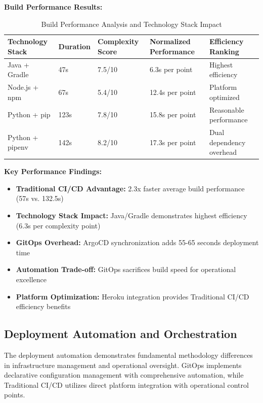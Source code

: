 \textbf{Build Performance Results:}

\begin{table}[H]
\centering
\caption{Build Performance Analysis and Technology Stack Impact}
\label{tab:build-performance-analysis}
\begin{tabular}{|p{3cm}|p{2cm}|p{2.5cm}|p{2.5cm}|p{3cm}|}
\hline
\textbf{Technology Stack} & \textbf{Duration} & \textbf{Complexity Score} & \textbf{Normalized Performance} & \textbf{Efficiency Ranking} \\
\hline
Java + Gradle & 47s & 7.5/10 & 6.3s per point & Highest efficiency \\
\hline
Node.js + npm & 67s & 5.4/10 & 12.4s per point & Platform optimized \\
\hline
Python + pip & 123s & 7.8/10 & 15.8s per point & Reasonable performance \\
\hline
Python + pipenv & 142s & 8.2/10 & 17.3s per point & Dual dependency overhead \\
\hline
\end{tabular}
\end{table}

\textbf{Key Performance Findings:}
\begin{itemize}
\item \textbf{Traditional CI/CD Advantage:} 2.3x faster average build performance (57s vs. 132.5s)
\item \textbf{Technology Stack Impact:} Java/Gradle demonstrates highest efficiency (6.3s per complexity point)
\item \textbf{GitOps Overhead:} ArgoCD synchronization adds 55-65 seconds deployment time
\item \textbf{Automation Trade-off:} GitOps sacrifices build speed for operational excellence
\item \textbf{Platform Optimization:} Heroku integration provides Traditional CI/CD efficiency benefits
\end{itemize}

\subsection{Deployment Automation and Orchestration}

The deployment automation demonstrates fundamental methodology differences in infrastructure management and operational oversight. GitOps implements declarative configuration management with comprehensive automation, while Traditional CI/CD utilizes direct platform integration with operational control points.

